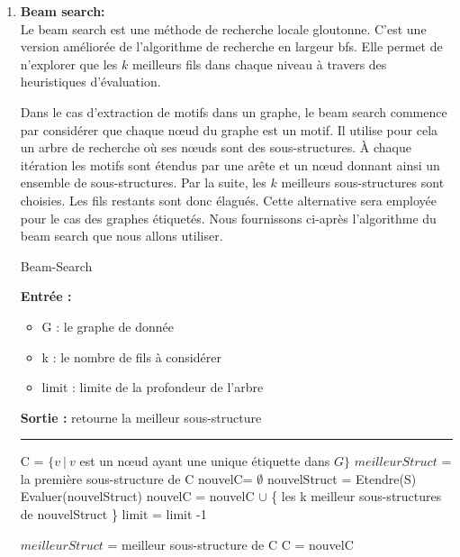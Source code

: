 \documentclass[a4paper,oneside,12pt]{report}
\theoremstyle{definition}
\begin{document}
\begin{enumerate}

\item \textbf{Beam search:}\\
Le beam search est une méthode de recherche locale gloutonne. C'est une version améliorée de l'algorithme de recherche en largeur \gls{bfs}. Elle permet de n'explorer que les $k$ meilleurs fils dans chaque niveau à travers des heuristiques d'évaluation.

Dans le cas d'extraction de motifs dans un graphe, le beam search commence par considérer que chaque nœud du graphe est un motif. Il utilise pour cela un arbre de recherche où ses nœuds sont des sous-structures. À chaque itération les motifs sont étendus par une arête et un nœud donnant ainsi un ensemble de sous-structures. Par la suite, les $k$ meilleurs sous-structures sont choisies. Les fils restants sont donc élagués. %
Cette alternative sera employée pour le cas des graphes étiquetés. Nous fournissons ci-après l'algorithme du beam search que nous allons utiliser. 


\begin{algorithm}[H]
					\label{alg:beamSearch}
					\caption{Beam-Search}
					\textbf{Entrée :}
						\begin{itemize}[label=$\bullet$]
							\item G : le graphe de donnée
							\item k : le nombre de fils à considérer
							\item limit : limite de la profondeur de l'arbre
						\end{itemize}
					\textbf{Sortie :} retourne la meilleur sous-structure\\							\noindent\rule{\textwidth}{1pt}
						
						
				\begin{algorithmic} [1]
					\STATE C = $\{v\ |\ v$ est un nœud ayant une unique étiquette dans  $G\}$
					\STATE $meilleurStruct$ = la première sous-structure de C
					\REPEAT
					\STATE nouvelC= $\emptyset$
						\STATE nouvelStruct = Etendre(S)
						\STATE Evaluer(nouvelStruct)
						\STATE nouvelC = nouvelC $\cup$ \{ les k meilleur sous-structures de nouvelStruct \}
					\ENDFOR
					\STATE limit = limit -1
					
					\STATE $meilleurStruct$  = meilleur sous-structure de C
					\ENDIF
					\STATE C = nouvelC
					

\end{algorithmic}
\end{algorithm}
\end{enumerate}
\end{document}
